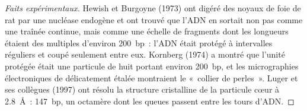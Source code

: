 \begin{proof}[Faits expérimentaux]
Hewish et Burgoyne (1973) ont digéré des noyaux de foie de rat par une
nucléase endogène et ont trouvé que l'ADN en sortait non pas comme une
traînée continue, mais comme une échelle de fragments dont les
longueurs étaient des multiples d'environ \qty{200}{bp}~: l'ADN était
protégé à intervalles réguliers et coupé seulement entre eux. Kornberg
(1974) a montré que l'unité protégée était une particule de huit
 portant environ \qty{200}{bp}, et les micrographies
électroniques de  délicatement étalée montraient le
«~collier de perles~». Luger et ses collègues (1997) ont résolu la
structure cristalline de la particule cœur à \qty{2.8}{\angstrom}~:
\qty{147}{bp}, un octamère dont les queues passent entre les tours
d'ADN.
\end{proof}

